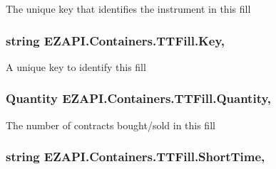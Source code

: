 The unique key that identifies the instrument in this fill 

\hypertarget{class_e_z_a_p_i_1_1_containers_1_1_t_t_fill_a376ab9b777c491649d9d788d60a71146}{
\subsubsection[{Key}]{\setlength{\rightskip}{0pt plus 5cm}string E\-Z\-A\-P\-I.\-Containers.\-T\-T\-Fill.\-Key\hspace{0.3cm}{\ttfamily [get]}, {\ttfamily [set]}}}\label{class_e_z_a_p_i_1_1_containers_1_1_t_t_fill_a376ab9b777c491649d9d788d60a71146}


A unique key to identify this fill 

\hypertarget{class_e_z_a_p_i_1_1_containers_1_1_t_t_fill_ae0d2b9a683ba6f43e00b53896be7a332}{
\subsubsection[{Quantity}]{\setlength{\rightskip}{0pt plus 5cm}Quantity E\-Z\-A\-P\-I.\-Containers.\-T\-T\-Fill.\-Quantity\hspace{0.3cm}{\ttfamily [get]}, {\ttfamily [set]}}}\label{class_e_z_a_p_i_1_1_containers_1_1_t_t_fill_ae0d2b9a683ba6f43e00b53896be7a332}


The number of contracts bought/sold in this fill 

\hypertarget{class_e_z_a_p_i_1_1_containers_1_1_t_t_fill_af50ed198ec4cb47defb5a4466d89146b}{
\subsubsection[{Short\-Time}]{\setlength{\rightskip}{0pt plus 5cm}string E\-Z\-A\-P\-I.\-Containers.\-T\-T\-Fill.\-Short\-Time\hspace{0.3cm}{\ttfamily [get]}, {\ttfamily [set]}}}\label{class_e_z_a_p_i_1_1_containers_1_1_t_t_fill_af50ed198ec4cb47defb5a4466d89146b}


